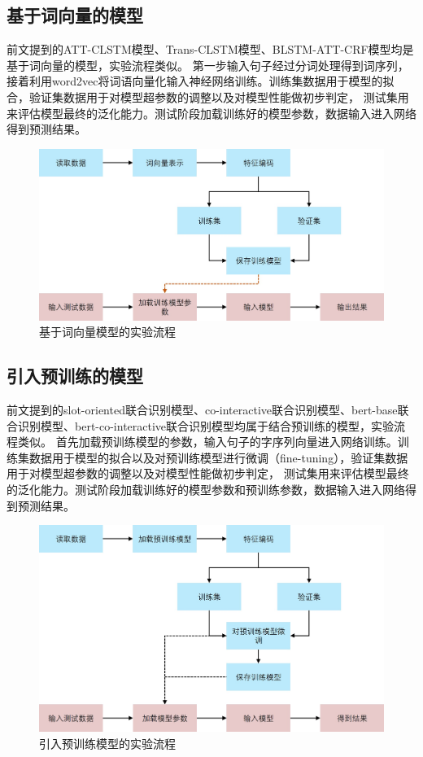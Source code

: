 \subsection{基于词向量的模型}
前文提到的ATT-CLSTM模型、Trans-CLSTM模型、BLSTM-ATT-CRF模型均是基于词向量的模型，实验流程类似。
第一步输入句子经过分词处理得到词序列，接着利用word2vec将词语向量化输入神经网络训练。训练集数据用于模型的拟合，验证集数据用于对模型超参数的调整以及对模型性能做初步判定，
测试集用来评估模型最终的泛化能力。测试阶段加载训练好的模型参数，数据输入进入网络得到预测结果。
\begin{figure}[htbp]
  \centering
  \includegraphics[scale=0.4]{./images/word2vecTrain.jpg}
  \caption{基于词向量模型的实验流程}
  \label{fig:word2vecTrain}
\end{figure}

\subsection{引入预训练的模型}
前文提到的slot-oriented联合识别模型、co-interactive联合识别模型、bert-base联合识别模型、bert-co-interactive联合识别模型均属于结合预训练的模型，实验流程类似。
首先加载预训练模型的参数，输入句子的字序列向量进入网络训练。训练集数据用于模型的拟合以及对预训练模型进行微调（fine-tuning），验证集数据用于对模型超参数的调整以及对模型性能做初步判定，
测试集用来评估模型最终的泛化能力。测试阶段加载训练好的模型参数和预训练参数，数据输入进入网络得到预测结果。
\begin{figure}[htbp]
  \centering
  \includegraphics[scale=0.4]{./images/bertTrain.jpg}
  \caption{引入预训练模型的实验流程}
  \label{fig:bertTrain}
\end{figure}


